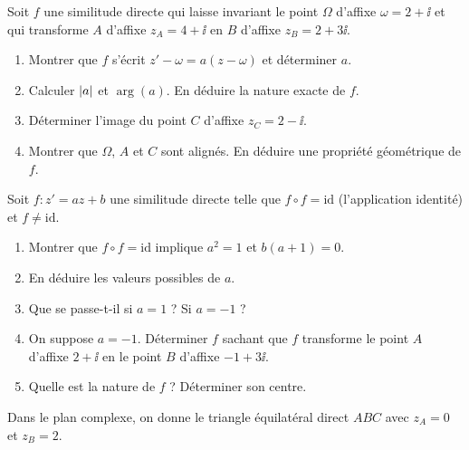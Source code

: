 
Soit $f$ une similitude directe qui laisse invariant le point $\Omega$ d'affixe
$\omega = 2 + \ii$ et qui transforme $A$ d'affixe $z_A = 4 + \ii$ en $B$ d'affixe
$z_B = 2 + 3\ii$.

\begin{enumerate}
	\item Montrer que $f$ s'écrit $z' - \omega = a(z - \omega)$ et déterminer $a$.
	\item Calculer $\left|a\right|$ et $\arg(a)$. En déduire la nature exacte de $f$.
	\item Déterminer l'image du point $C$ d'affixe $z_C = 2 - \ii$.
	\item Montrer que $\Omega$, $A$ et $C$ sont alignés.
	En déduire une propriété géométrique de $f$.
\end{enumerate}



Soit $f : z' = az + b$ une similitude directe telle que $f \circ f = \mathrm{id}$
(l'application identité) et $f \neq \mathrm{id}$.

\begin{enumerate}
	\item Montrer que $f \circ f = \mathrm{id}$ implique $a^2 = 1$ et $b(a+1) = 0$.
	\item En déduire les valeurs possibles de $a$.
	\item Que se passe-t-il si $a = 1$ ? Si $a = -1$ ?
	\item On suppose $a = -1$. Déterminer $f$ sachant que $f$ transforme
	le point $A$ d'affixe $2 + \ii$ en le point $B$ d'affixe $-1 + 3\ii$.
	\item Quelle est la nature de $f$ ? Déterminer son centre.
\end{enumerate}



Dans le plan complexe, on donne le triangle équilatéral direct $ABC$ avec
$z_A = 0$ et $z_B = 2$.

